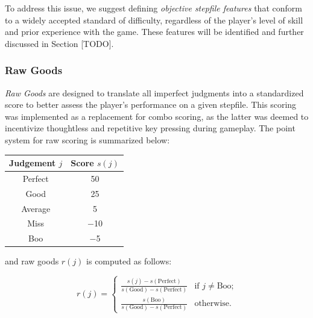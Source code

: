 \vspace{2mm}

To address this issue, we suggest defining \textit{objective stepfile features} that conform to a widely accepted standard of difficulty, regardless of the player's level of skill and prior experience with the game. These features will be identified and further discussed in Section [TODO].

\subsubsection{Raw Goods}

\textit{Raw Goods} are designed to translate all imperfect judgments into a standardized score to better assess the player's performance on a given stepfile. This scoring was implemented as a replacement for combo scoring, as the latter was deemed to incentivize thoughtless and repetitive key pressing during gameplay. The point system for raw scoring is summarized below:

\begin{center}
	\begin{tabular}{c@{\hskip 10mm}c}
		\hspace{5mm} \textbf{Judgement} $j$ \hspace{5mm} & \textbf{Score} $s(j)$ \\
		\hline
		
		Perfect                               & 50                    \\
		Good                                  & 25                    \\
		Average                               & 5                     \\
		Miss                                  & $-$10                 \\
		Boo                                   & $-$5                  \\
	\end{tabular}
\end{center}

and raw goods $r(j)$ is computed as follows:

\begin{equation*}
	r(j) = 
	\begin{cases}
		\displaystyle \frac{s(j) - s(\text{Perfect})}{s(\text{Good}) - s(\text{Perfect})}
		  &   
		\text{if $j \neq \text{Boo}$;}
		\\[10pt]
		\displaystyle \frac{s(\text{Boo})}{s(\text{Good}) - s(\text{Perfect})}
		  &   
		\text{otherwise.}
	\end{cases}
\end{equation*}

